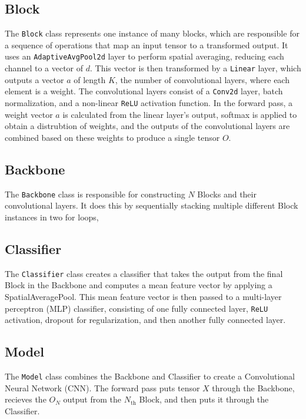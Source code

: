 \documentclass[12pt]{article}
\begin{document}
\subsection{Block}
The \texttt{Block} class represents one instance of many blocks, which are responsible for a sequence of operations that map an input tensor to a transformed output. It uses an \texttt{AdaptiveAvgPool2d} layer to perform spatial averaging, reducing each channel to a vector of \(d\). This vector is then transformed by a \texttt{Linear} layer, which outputs a vector \( a \) of length \( K \), the number of convolutional layers, where each element is a weight. The convolutional layers consist of a \texttt{Conv2d} layer, batch normalization, and a non-linear \texttt{ReLU} activation function. In the forward pass, a weight vector \( a \) is calculated from the linear layer's output, softmax is applied to obtain a distrubtion of weights, and the outputs of the convolutional layers are combined based on these weights to produce a single tensor \( O \). 

\restoregeometry
\subsection{Backbone}
The \texttt{Backbone} class is responsible for constructing \( N \) Blocks and their convolutional layers. It does this by sequentially stacking multiple different Block instances in two for loops,  

\subsection{Classifier}
The \texttt{Classifier} class creates a classifier that takes the output from the final Block in the Backbone and computes a mean feature vector by applying a SpatialAveragePool. This mean feature vector is then passed to a multi-layer perceptron (MLP) classifier, consisting of one fully connected layer, \texttt{ReLU} activation, dropout for regularization, and then another fully connected layer.

\subsection{Model}
The \texttt{Model} class combines the Backbone and Classifier to create a Convolutional Neural Network (CNN). The forward pass puts tensor \( X \) through the Backbone, recieves the \( O_N \) output from the \( N_{\text{th}} \) Block, and then puts it through the Classifier. 
\end{document}
